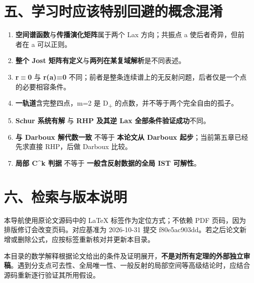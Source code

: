 \section{五、学习时应该特别回避的概念混淆}

\begin{enumerate}[leftmargin=2em]
\item \textbf{空间谱函数}与\textbf{传播演化矩阵}属于两个 Lax 方向；共振点 a 使后者奇异，但前者在 a 可以正则。
\item \textbf{整个 Jost 矩阵有定义}与\textbf{两列在某复域解析}是不同表述。
\item \textbf{r\ensuremath{\equiv}0} 与 \textbf{r(a)=0} 不同；前者是整条连续谱上的无反射问题，后者仅是一个点的必要相容条件。
\item \textbf{一轨道}含完整四点，m=2 是 D\textsubscript{+} 的点数，并不等于两个完全自由的孤子。
\item \textbf{Schur 系统有解} 与 \textbf{RHP 及其逆 Lax 全部条件验证成功}不同。
\item \textbf{与 Darboux 解代数一致} 不等于 \textbf{本论文从 Darboux 起步}；当前第五章已经先求直接 RHP，后做 Darboux 比较。
\item \textbf{局部 C\textasciicircum{}k 判据} 不等于 \textbf{一般含反射数据的全局 IST 可解性}。
\end{enumerate}

\section{六、检索与版本说明}

本导航使用原论文源码中的 LaTeX 标签作为定位方式；不依赖 PDF 页码，因为排版修订会改变页码。对应基准为 2026-10-31 提交 f80e5ac903dd。若之后论文新增或删除公式，应按标签重新核对并更新本目录。\par

本目录的数学解释根据论文给出的条件及证明展开，\textbf{不是对所有定理的外部独立审稿}。遇到分支点可去性、全局唯一性、一般反射的局部空间等高级结论时，应结合源码重新逐行验证其所用假设。\par

